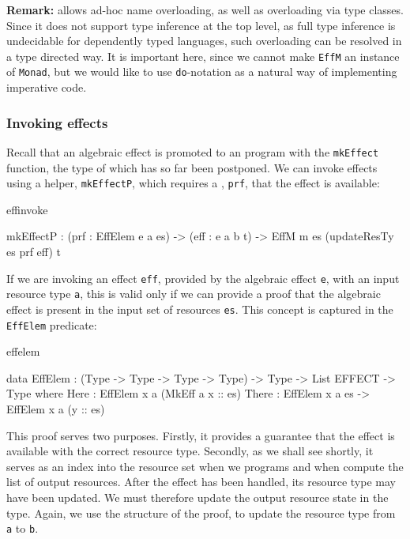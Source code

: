 \textbf{Remark:} \Idris{} allows ad-hoc name overloading, as well as overloading via type classes.
Since it does not support type inference at the top level, as full type inference
is undecidable for dependently typed languages, such overloading can be
resolved in a type directed way.
It is important here, since we cannot make
\texttt{EffM} an instance of \texttt{Monad}, but we would like to use
\texttt{do}-notation as a natural way of implementing imperative code.

\subsubsection{Invoking effects}

Recall that an algebraic effect is promoted to an \Eff{} program 
with the \texttt{mkEffect} function, the type of which has so far
been postponed. We can invoke effects using a helper, \texttt{mkEffectP}, which
requires a , \texttt{prf},
that the effect 
is available:

\begin{SaveVerbatim}{effinvoke}

mkEffectP : (prf : EffElem e a es) -> 
            (eff : e a b t) -> 
            EffM m es (updateResTy es prf eff) t

\end{SaveVerbatim}

\noindent
If we are invoking an effect \texttt{eff}, provided by the algebraic effect
\texttt{e}, with an input resource type \texttt{a},
this is valid only if we can provide a proof that the algebraic effect is
present in the input set of resources \texttt{es}. This concept is captured
in the \texttt{EffElem} predicate:

\begin{SaveVerbatim}{effelem}

data EffElem : (Type -> Type -> Type -> Type) -> 
               Type -> List EFFECT -> Type where
     Here : EffElem x a (MkEff a x :: es)
     There : EffElem x a es -> EffElem x a (y :: es)

\end{SaveVerbatim}

\noindent
This proof serves two purposes. Firstly, it provides a guarantee that the effect
is available with the correct resource type. Secondly, as we shall see shortly,
it serves as an index into the resource set when we  programs
and when compute the list of output resources.
%
After the effect has been handled, its resource type may have been updated.
We must therefore update the output resource state in the type. Again, we use
the structure of the proof, to update the resource type from \texttt{a} to
\texttt{b}.

